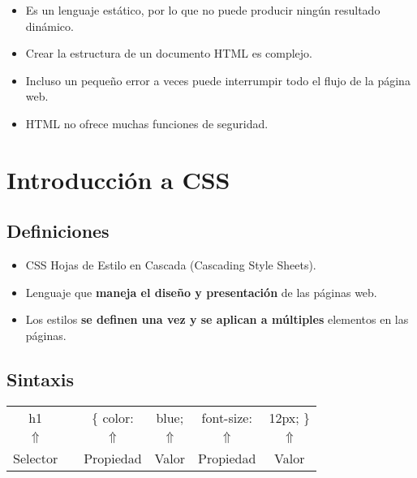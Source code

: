 \begin{itemize}
    \item Es un lenguaje estático, por lo que no puede producir ningún resultado dinámico.
    \item Crear la estructura de un documento HTML es complejo.
    \item Incluso un pequeño error a veces puede interrumpir todo el flujo de la página web.
    \item HTML no ofrece muchas funciones de seguridad.
\end{itemize}


\section{Introducción a CSS}

\subsection*{Definiciones}
\begin{itemize}
    \item CSS Hojas de Estilo en Cascada (Cascading Style Sheets).
    \item Lenguaje que \textbf{maneja el diseño y presentación} de las páginas web.
    \item Los estilos \textbf{se definen una vez y se aplican a múltiples} elementos en las páginas.    
\end{itemize}

\subsection*{Sintaxis}

\begin{center}
\begin{tabular}{c c c c c c}
    h1         & & $\{$ color: & blue;      & font-size: & 12px; $\}$ \\
    $\Uparrow$ & & $\Uparrow$  & $\Uparrow$ & $\Uparrow$ & $\Uparrow$\\
    Selector   & & Propiedad   & Valor      & Propiedad  & Valor \\
\end{tabular}
\end{center}
